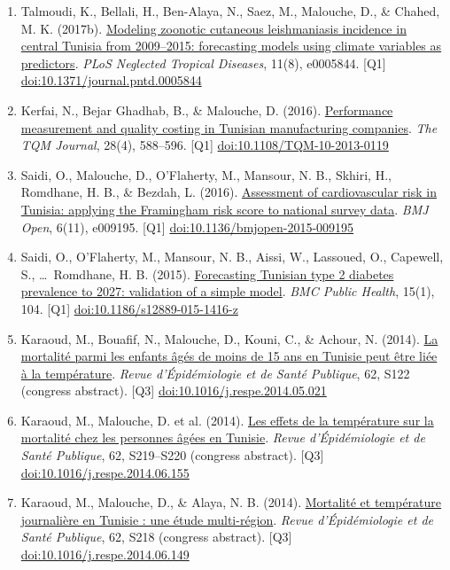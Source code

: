 \documentclass[10pt,a4paper]{article}
\newcommand{\doi}[1]{\href{https://doi.org/#1}{doi:#1}}
\newcommand{\Qu}[1]{[Q#1]}
\begin{document}
\begin{enumerate}[resume*]
\item Talmoudi, K., Bellali, H., Ben-Alaya, N., Saez, M., Malouche, D., \& Chahed, M. K. (2017b). \href{https://doi.org/10.1371/journal.pntd.0005844}{Modeling zoonotic cutaneous leishmaniasis incidence in central Tunisia from 2009--2015: forecasting models using climate variables as predictors}. \emph{PLoS Neglected Tropical Diseases}, 11(8), e0005844. \Qu1 \doi{10.1371/journal.pntd.0005844}
\item Kerfai, N., Bejar Ghadhab, B., \& Malouche, D. (2016). \href{https://www.emerald.com/insight/content/doi/10.1108/TQM-10-2013-0119/full/html}{Performance measurement and quality costing in Tunisian manufacturing companies}. \emph{The TQM Journal}, 28(4), 588--596. \Qu1 \doi{10.1108/TQM-10-2013-0119}
\item Saidi, O., Malouche, D., O'Flaherty, M., Mansour, N. B., Skhiri, H., Romdhane, H. B., \& Bezdah, L. (2016). \href{https://doi.org/10.1136/bmjopen-2015-009195}{Assessment of cardiovascular risk in Tunisia: applying the Framingham risk score to national survey data}. \emph{BMJ Open}, 6(11), e009195. \Qu1 \doi{10.1136/bmjopen-2015-009195}
\item Saidi, O., O'Flaherty, M., Mansour, N. B., Aissi, W., Lassoued, O., Capewell, S., \ldots\ Romdhane, H. B. (2015). \href{https://bmcpublichealth.biomedcentral.com/articles/10.1186/s12889-015-1416-z}{Forecasting Tunisian type 2 diabetes prevalence to 2027: validation of a simple model}. \emph{BMC Public Health}, 15(1), 104. \Qu1 \doi{10.1186/s12889-015-1416-z}
\item Karaoud, M., Bouafif, N., Malouche, D., Kouni, C., \& Achour, N. (2014). \href{https://www.em-consulte.com/article/911510/article/la-mortalite-parmi-les-enfants-ages-de-moins-de15}{La mortalit\'e parmi les enfants \^ag\'es de moins de 15 ans en Tunisie peut \^etre li\'ee \`a la temp\'erature}. \emph{Revue d'\'Epid\'emiologie et de Sant\'e Publique}, 62, S122 (congress abstract). \Qu3 \doi{10.1016/j.respe.2014.05.021}
\item Karaoud, M., Malouche, D. et al. (2014). \href{https://www.em-consulte.com/article/915656/les-effets-de-la-temperature-sur-la-mortalite-chez}{Les effets de la temp\'erature sur la mortalit\'e chez les personnes \^ag\'ees en Tunisie}. \emph{Revue d'\'Epid\'emiologie et de Sant\'e Publique}, 62, S219--S220 (congress abstract). \Qu3 \doi{10.1016/j.respe.2014.06.155}
\item Karaoud, M., Malouche, D., \& Alaya, N. B. (2014). \href{https://www.em-consulte.com/article/915651/article/mortalite-et-temperature-journaliere-en-tunisie\%C2\%A0-u}{Mortalit\'e et temp\'erature journali\`ere en Tunisie : une \'etude multi-r\'egion}. \emph{Revue d'\'Epid\'emiologie et de Sant\'e Publique}, 62, S218 (congress abstract). \Qu3 \doi{10.1016/j.respe.2014.06.149}

\end{enumerate}
\end{document}
